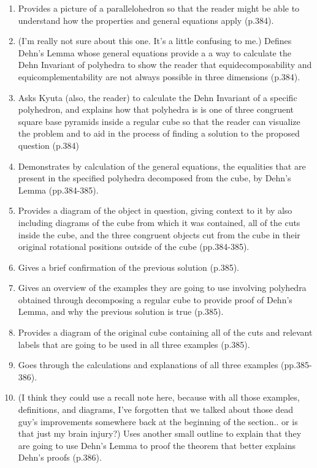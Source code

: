\documentclass{article}
\begin{document}
\begin{enumerate}
    \item Provides a picture of a parallelohedron so that the reader might be able to understand how the properties and general equations apply (p.384).
    
    \item (I'm really not sure about this one. It's a little confusing to me.) Defines Dehn's Lemma whose general equations provide a a way to calculate the Dehn Invariant of polyhedra to show the reader that equidecomposability and equicomplementability are not always possible in three dimensions (p.384).
    
    \item Asks Kyuta (also, the reader) to calculate the Dehn Invariant of a specific polyhedron, and explains how that polyhedra is is one of three congruent square base pyramids inside a regular cube so that the reader can visualize the problem and to aid in the process of finding a solution to the proposed question (p.384)
    
    \item Demonstrates by calculation of the general equations, the equalities that are present in the specified polyhedra decomposed from the cube, by Dehn's Lemma (pp.384-385).
    
    \item Provides a diagram of the object in question, giving context to it by also including diagrams of the cube from which it was contained, all of the cuts inside the cube, and the three congruent objects cut from the cube in their original rotational positions outside of the cube (pp.384-385).
    
    \item Gives a brief confirmation of the previous solution (p.385).
    
    \item Gives an overview of the examples they are going to use involving polyhedra obtained through decomposing a regular cube to provide proof of Dehn's Lemma, and why the previous solution is true (p.385).
    
    \item Provides a diagram of the original cube containing all of the cuts and relevant labels that are going to be used in all three examples (p.385).
    
    \item Goes through the calculations and explanations of all three examples (pp.385-386).
    
    \item (I think they could use a recall note here, because with all those examples, definitions, and diagrams, I've forgotten that we talked about those dead guy's improvements somewhere back at the beginning of the section.. or is that just my brain injury?) Uses another small outline to explain that they are going to use Dehn's Lemma to proof the theorem that better explains Dehn's proofs (p.386).
    

\end{enumerate}
\end{document}
